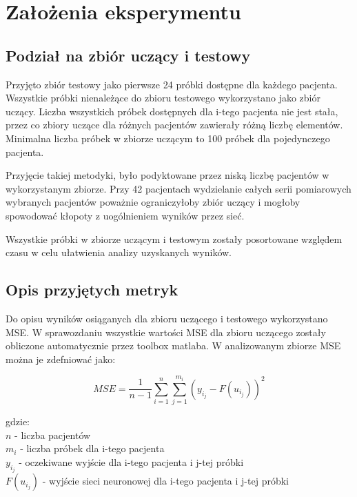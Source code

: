\documentclass[12pt]{article}
\begin{document}
\newpage
\section{Założenia eksperymentu}

\subsection{Podział na zbiór uczący i testowy}
 Przyjęto zbiór testowy jako pierwsze 24 próbki dostępne dla każdego pacjenta. Wszystkie próbki nienależące do zbioru testowego wykorzystano jako zbiór uczący. Liczba wszystkich próbek dostępnych dla i-tego pacjenta nie jest stała, przez co zbiory uczące dla różnych pacjentów zawierały różną liczbę elementów. Minimalna liczba próbek w zbiorze uczącym to 100 próbek dla pojedynczego pacjenta.
 
Przyjęcie takiej metodyki, było podyktowane przez niską liczbę pacjentów w wykorzystanym zbiorze. Przy 42 pacjentach wydzielanie całych serii pomiarowych wybranych pacjentów poważnie ograniczyłoby zbiór uczący i mogłoby spowodować kłopoty z uogólnieniem wyników przez sieć.

Wszystkie próbki w zbiorze uczącym i testowym zostały posortowane względem czasu w celu ułatwienia analizy uzyskanych wyników.

\subsection{Opis przyjętych metryk}

Do opisu wyników osiąganych dla zbioru uczącego i testowego wykorzystano MSE. W sprawozdaniu wszystkie wartości MSE dla zbioru uczącego zostały obliczone automatycznie przez toolbox matlaba. W analizowanym zbiorze MSE można je zdefniować jako:

\begin{equation}
 	MSE = \frac{1}{n-1} \sum_{i=1}^{n} \sum_{j=1}^{m_i} (y_{i_j} - F(u_{i_j}))^2
\end{equation}
 
 gdzie:\\
 $n$ - liczba pacjentów \\
 $m_i$ - liczba próbek dla i-tego pacjenta \\
 $y_{i_j}$ - oczekiwane wyjście dla i-tego pacjenta i j-tej próbki \\
 $F(u_{i_j})$ - wyjście sieci neuronowej dla i-tego pacjenta i j-tej próbki

\newpage
\end{document}
